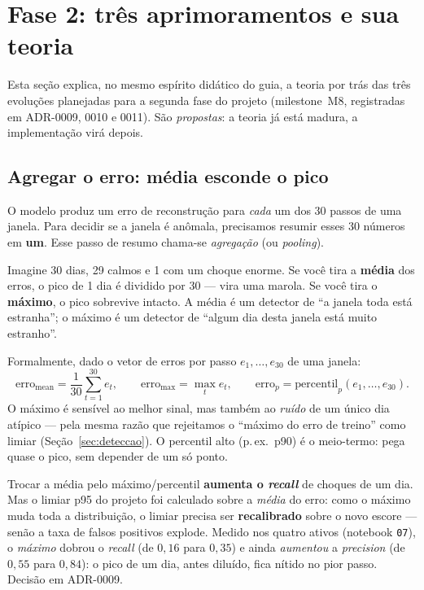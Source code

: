 \section{Fase 2: três aprimoramentos e sua teoria}
\label{sec:fase2}

Esta seção explica, no mesmo espírito didático do guia, a teoria por trás das três evoluções
planejadas para a segunda fase do projeto (milestone~M8, registradas em ADR-0009, 0010 e 0011).
São \emph{propostas}: a teoria já está madura, a implementação virá depois.

\subsection{Agregar o erro: média esconde o pico}
\label{sec:fase2-pooling}

O modelo produz um erro de reconstrução para \emph{cada} um dos 30 passos de uma janela. Para
decidir se a janela é anômala, precisamos resumir esses 30 números em \textbf{um}. Esse passo de
resumo chama-se \emph{agregação} (ou \emph{pooling}).

\begin{intuicao}
Imagine 30 dias, 29 calmos e 1 com um choque enorme. Se você tira a \textbf{média} dos erros,
o pico de 1 dia é dividido por 30 --- vira uma marola. Se você tira o \textbf{máximo}, o pico
sobrevive intacto. A média é um detector de ``a janela toda está estranha''; o máximo é um
detector de ``algum dia desta janela está muito estranho''.
\end{intuicao}

Formalmente, dado o vetor de erros por passo $e_1,\dots,e_{30}$ de uma janela:
\[
\text{erro}_{\text{mean}} = \frac{1}{30}\sum_{t=1}^{30} e_t,
\qquad
\text{erro}_{\text{max}} = \max_t e_t,
\qquad
\text{erro}_{p} = \text{percentil}_p(e_1,\dots,e_{30}).
\]
O máximo é sensível ao melhor sinal, mas também ao \emph{ruído} de um único dia atípico --- pela
mesma razão que rejeitamos o ``máximo do erro de treino'' como limiar (Seção~\ref{sec:deteccao}).
O percentil alto (p.\,ex.\ p90) é o meio-termo: pega quase o pico, sem depender de um só ponto.

\begin{naprat}
Trocar a média pelo máximo/percentil \textbf{aumenta o \emph{recall}} de choques de um dia. Mas
o limiar p95 do projeto foi calculado sobre a \emph{média} do erro: como o máximo muda toda a
distribuição, o limiar precisa ser \textbf{recalibrado} sobre o novo escore --- senão a taxa de
falsos positivos explode. Medido nos quatro ativos (notebook \texttt{07}), o \emph{máximo} dobrou
o \emph{recall} (de $0{,}16$ para $0{,}35$) e ainda \emph{aumentou} a \emph{precision} (de
$0{,}55$ para $0{,}84$): o pico de um dia, antes diluído, fica nítido no pior passo. Decisão em
ADR-0009.
\end{naprat}

